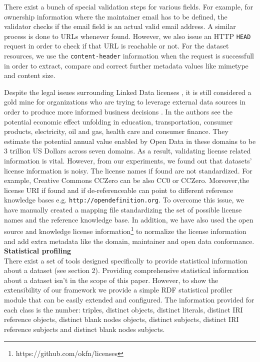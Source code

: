 \documentclass[runningheads,a4paper]{llncs}
\begin{document}
There exist a bunch of special validation steps for various fields. For example, for ownership information where the maintainer email has to be defined, the validator checks if the email field is an actual valid email address. A similar process is done to URLs whenever found. However, we also issue an HTTP \texttt{HEAD} request in order to check if that URL is reachable or not. For the dataset resources, we use the \texttt{content-header} information when the request is successfull in order to extract, compare and correct further metadata values like mimetype and content size.

Despite the legal issues surrounding Linked Data licenses \cite{nomoneyLOD}, it is still considered a gold mine for organizations who are trying to leverage external data sources in order to produce more informed business decisions \cite{Boyd2011}. In \cite{mckinseyreport} the authors see the potential economic effect unfolding in education, transportation, consumer products, electricity, oil and gas, health care and consumer finance. They estimate the potential annual value enabled by Open Data in these domains to be 3 trillion US Dollars across seven domains. As a result, validating license related information is vital. However, from our experiments, we found out that datasets' license information is noisy. The license names if found are not standardized. For example, Creative Commons CCZero can be also CC0 or CCZero. Moreover,the license URI if found and if de-referenceable can point to different reference knowledge bases e.g. \texttt{http://opendefinition.org}. To overcome this issue, we have manually created a mapping file standardizing the set of possible license names and the reference knowledge base. In addition, we have also used the open source and knowledge license information\footnote{https://github.com/okfn/licenses} to normalize the license information and add extra metadata like the domain, maintainer and open data conformance. \\


\textbf{Statistical profiling}\\

There exist a set of tools designed specifically to provide statistical information about a dataset (see section 2). Providing comprehensive statistical information about a dataset isn't in the scope of this paper. However, to show the extensibility of our framework we provide a simple RDF statistical profiler module that can be easily extended and configured. The information provided for each class is the number: triples, distinct objects, distinct literals, distinct IRI reference objects, distinct blank nodes objects, distinct subjects, distinct IRI reference subjects and distinct blank nodes subjects.\\
\end{document}
